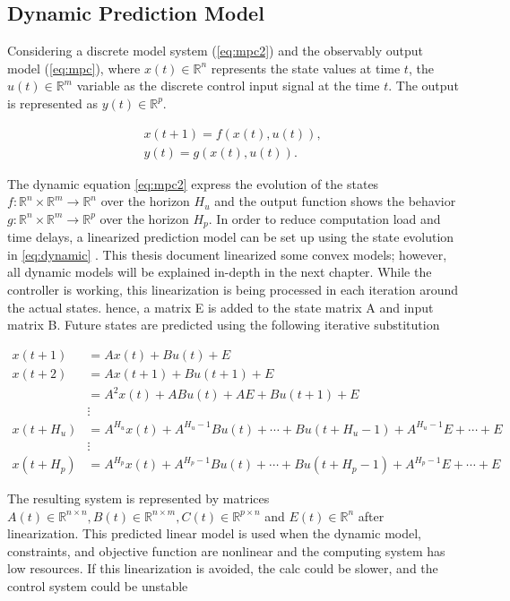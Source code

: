 \subsection{Dynamic Prediction Model}

Considering a discrete model system (\ref{eq:mpc2}) and the observably output model (\ref{eq:mpc}), where $x(t) \in \mathbb{R}^n$ represents the state values at time $t$, the $u(t) \in \mathbb{R}^m$ variable as the discrete control input signal at the time $t$. The output is represented as  $y(t) \in \mathbb{R}^p$.

\begin{align}
    x(t+1) = f(x(t),u(t)),\label{eq:mpc2}\\
    y(t) = g(x(t),u(t)). \label{eq:mpc}
\end{align}

The dynamic equation \ref{eq:mpc2} express the evolution  of the states $f:\mathbb{R}^n \times \mathbb{R}^m \to  \mathbb{R}^n$ over the horizon $H_u$ and the output function shows the behavior $g:\mathbb{R}^n \times \mathbb{R}^m \to  \mathbb{R}^p$ over the horizon $H_p$. 
In order to reduce computation load and time delays, a linearized prediction model can be set up using the state evolution in \ref{eq:dynamic} . This thesis document linearized some convex models; however, all dynamic models will be explained in-depth in the next chapter. While the controller is working, this linearization is being processed in each iteration around the actual states. hence, a matrix E is added to the state matrix A and input matrix B. Future states are predicted using the following iterative substitution

\begin{align}
x(t+1) & = Ax(t) + Bu(t)+E \\
x(t+2) & = Ax(t+1) + Bu(t+1)+E\\
       & = A^2x(t) + ABu(t)+AE +Bu(t+1) +E\\
       & \vdots  \\
x(t+H_u) & = A^{H_u}x(t) + A^{H_u-1}Bu(t)+\cdots + Bu(t+H_u-1)+ A^{H_u-1}E+\cdots +E\\
      & \vdots  \\
x(t+H_p) & = A^{H_p}x(t) + A^{H_p-1}Bu(t)+\cdots + Bu(t+H_p-1)+ A^{H_p-1}E+\cdots +E
\label{eq:dynamic}
\end{align}

The resulting system is represented by matrices $A(t) \in \mathbb{R}^{n \times n}, B(t) \in \mathbb{R}^{n \times m}, C(t) \in \mathbb{R}^{p \times n} $ and $E(t) \in \mathbb{R}^{n}$ after linearization. This predicted linear model is used when the dynamic model, constraints, and objective function are nonlinear and the computing system has low resources. If this linearization is avoided, the calc could be slower, and the control system could be unstable


